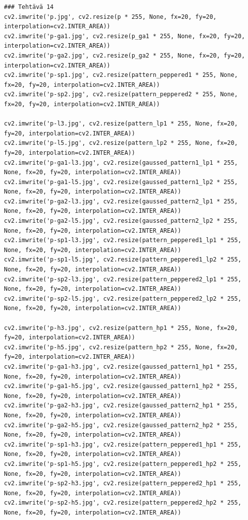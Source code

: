 \documentclass{article}
\begin{document}
\begin{verbatim}
### Tehtävä 14
cv2.imwrite('p.jpg', cv2.resize(p * 255, None, fx=20, fy=20, interpolation=cv2.INTER_AREA))
cv2.imwrite('p-ga1.jpg', cv2.resize(p_ga1 * 255, None, fx=20, fy=20, interpolation=cv2.INTER_AREA))
cv2.imwrite('p-ga2.jpg', cv2.resize(p_ga2 * 255, None, fx=20, fy=20, interpolation=cv2.INTER_AREA))
cv2.imwrite('p-sp1.jpg', cv2.resize(pattern_peppered1 * 255, None, fx=20, fy=20, interpolation=cv2.INTER_AREA))
cv2.imwrite('p-sp2.jpg', cv2.resize(pattern_peppered2 * 255, None, fx=20, fy=20, interpolation=cv2.INTER_AREA))

cv2.imwrite('p-l3.jpg', cv2.resize(pattern_lp1 * 255, None, fx=20, fy=20, interpolation=cv2.INTER_AREA))
cv2.imwrite('p-l5.jpg', cv2.resize(pattern_lp2 * 255, None, fx=20, fy=20, interpolation=cv2.INTER_AREA))
cv2.imwrite('p-ga1-l3.jpg', cv2.resize(gaussed_pattern1_lp1 * 255, None, fx=20, fy=20, interpolation=cv2.INTER_AREA))
cv2.imwrite('p-ga1-l5.jpg', cv2.resize(gaussed_pattern1_lp2 * 255, None, fx=20, fy=20, interpolation=cv2.INTER_AREA))
cv2.imwrite('p-ga2-l3.jpg', cv2.resize(gaussed_pattern2_lp1 * 255, None, fx=20, fy=20, interpolation=cv2.INTER_AREA))
cv2.imwrite('p-ga2-l5.jpg', cv2.resize(gaussed_pattern2_lp2 * 255, None, fx=20, fy=20, interpolation=cv2.INTER_AREA))
cv2.imwrite('p-sp1-l3.jpg', cv2.resize(pattern_peppered1_lp1 * 255, None, fx=20, fy=20, interpolation=cv2.INTER_AREA))
cv2.imwrite('p-sp1-l5.jpg', cv2.resize(pattern_peppered1_lp2 * 255, None, fx=20, fy=20, interpolation=cv2.INTER_AREA))
cv2.imwrite('p-sp2-l3.jpg', cv2.resize(pattern_peppered2_lp1 * 255, None, fx=20, fy=20, interpolation=cv2.INTER_AREA))
cv2.imwrite('p-sp2-l5.jpg', cv2.resize(pattern_peppered2_lp2 * 255, None, fx=20, fy=20, interpolation=cv2.INTER_AREA))

cv2.imwrite('p-h3.jpg', cv2.resize(pattern_hp1 * 255, None, fx=20, fy=20, interpolation=cv2.INTER_AREA))
cv2.imwrite('p-h5.jpg', cv2.resize(pattern_hp2 * 255, None, fx=20, fy=20, interpolation=cv2.INTER_AREA))
cv2.imwrite('p-ga1-h3.jpg', cv2.resize(gaussed_pattern1_hp1 * 255, None, fx=20, fy=20, interpolation=cv2.INTER_AREA))
cv2.imwrite('p-ga1-h5.jpg', cv2.resize(gaussed_pattern1_hp2 * 255, None, fx=20, fy=20, interpolation=cv2.INTER_AREA))
cv2.imwrite('p-ga2-h3.jpg', cv2.resize(gaussed_pattern2_hp1 * 255, None, fx=20, fy=20, interpolation=cv2.INTER_AREA))
cv2.imwrite('p-ga2-h5.jpg', cv2.resize(gaussed_pattern2_hp2 * 255, None, fx=20, fy=20, interpolation=cv2.INTER_AREA))
cv2.imwrite('p-sp1-h3.jpg', cv2.resize(pattern_peppered1_hp1 * 255, None, fx=20, fy=20, interpolation=cv2.INTER_AREA))
cv2.imwrite('p-sp1-h5.jpg', cv2.resize(pattern_peppered1_hp2 * 255, None, fx=20, fy=20, interpolation=cv2.INTER_AREA))
cv2.imwrite('p-sp2-h3.jpg', cv2.resize(pattern_peppered2_hp1 * 255, None, fx=20, fy=20, interpolation=cv2.INTER_AREA))
cv2.imwrite('p-sp2-h5.jpg', cv2.resize(pattern_peppered2_hp2 * 255, None, fx=20, fy=20, interpolation=cv2.INTER_AREA))


\end{verbatim}
\end{document}
